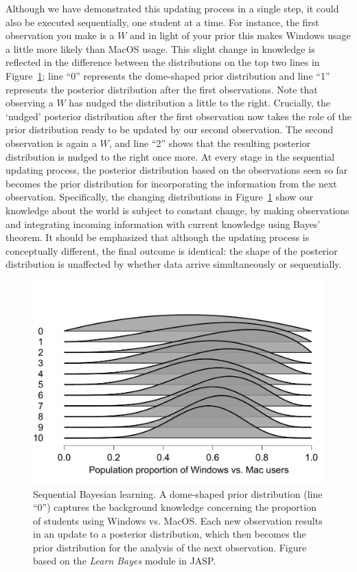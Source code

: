\documentclass[man]{apa7}
\begin{document}
Although we have demonstrated this updating process in a single step, it could also be executed sequentially, one student at a time. For instance, the first observation you make is a $W$ and in light of your prior this makes Windows usage a little more likely than MacOS usage. This slight change in knowledge is reflected in the difference between the distributions on the top two lines in Figure~\ref{fig:WindowsMacSequential}; line ``0'' represents the dome-shaped prior distribution and line ``1'' represents the posterior distribution after the first observations. Note that observing a $W$ has nudged the distribution a little to the right. Crucially, the `nudged' posterior distribution after the first observation now takes the role of the prior distribution ready to be updated by our second observation. The second observation is again a $W$, and line ``2'' shows that the resulting posterior distribution is nudged to the right once more. At every stage in the sequential updating process, the posterior distribution based on the observations seen so far becomes the prior distribution for incorporating the information from the next observation. Specifically, the changing distributions in Figure~\ref{fig:WindowsMacSequential} show our knowledge about the world is subject to constant change, by making observations and integrating incoming information with current knowledge using Bayes' theorem. It should be emphasized that although the updating process is conceptually different, the final outcome is identical: the shape of the posterior distribution is unaffected by whether data arrive simultaneously or sequentially.

\begin{figure}[h]
\begin{center}
\includegraphics[width = .65\paperwidth]{WindowsMacSequential.pdf}
\caption{Sequential Bayesian learning. A dome-shaped prior distribution (line ``0'') captures the background knowledge concerning the proportion of students using Windows vs. MacOS. Each new observation results in an update to a posterior distribution, which then becomes the prior distribution for the analysis of the next observation. Figure based on the \emph{Learn Bayes} module in JASP.}
\label{fig:WindowsMacSequential}
\end{center}
\end{figure}
\end{document}
